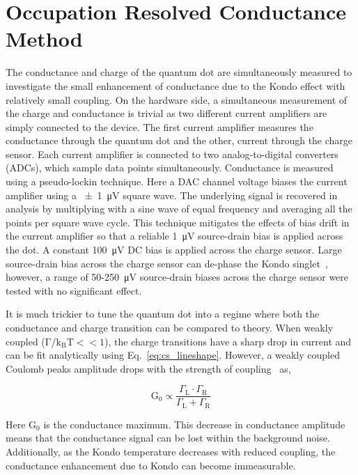 \section{Occupation Resolved Conductance Method}
The conductance and charge of the quantum dot are simultaneously measured to investigate the small enhancement of conductance due to the Kondo effect with relatively small coupling. On the hardware side, a simultaneous measurement of the charge and conductance is trivial as two different current amplifiers are simply connected to the device. 
The first current amplifier measures the conductance through the quantum dot and the other, current through the charge sensor. Each current amplifier is connected to two analog-to-digital converters (ADCs), which sample data points simultaneously. 
Conductance is measured using a pseudo-lockin technique. Here a DAC channel voltage biases the current amplifier using a \qty{\pm1}{\micro V} square wave. The underlying signal is recovered in analysis by multiplying with a sine wave of equal frequency and averaging all the points per square wave cycle. This technique mitigates the effects of bias drift in the current amplifier so that a reliable \qty{1}{\micro V} source-drain bias is applied across the dot. 
A constant \qty{100}{\micro V} DC bias is applied across the charge sensor. Large source-drain bias across the charge sensor can de-phase the Kondo singlet~\cite{kondo_controlled_dephasing}, however, a range of 50-\qty{250}{\micro V} source-drain biases across the charge sensor were tested with no significant effect.

It is much trickier to tune the quantum dot into a regime where both the conductance and charge transition can be compared to theory. When weakly coupled ($\mathrm{\Gamma/k_BT}<<1$), the charge transitions have a sharp drop in current and can be fit analytically using Eq.~\ref{eq:cs_lineshape}. However, a weakly coupled Coulomb peaks amplitude drops with the strength of coupling~\cite{Kouwenhoven_1997_electron_transport} as,


\begin{equation}\label{eq:cond_amp}
 \mathrm{G_0} \propto
 \frac{\Gamma_\mathrm{L}\cdot\Gamma_\mathrm{R}}{\Gamma_\mathrm{L}+\Gamma_\mathrm{R}}
\end{equation}


\noindent Here $\mathrm{G_0}$ is the conductance maximum. This decrease in conductance amplitude means that the conductance signal can be lost within the background noise. Additionally, as the Kondo temperature decreases with reduced coupling, the conductance enhancement due to Kondo can become immeasurable.


